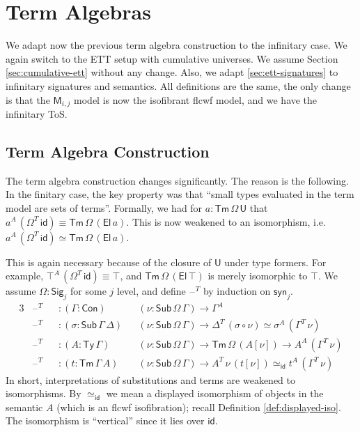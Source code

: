 \documentclass[12pt,a4paper,twoside,openany]{book}
\theoremstyle{remark}
\theoremstyle{definition}
\theoremstyle{theorem}
\newcommand{\bs}[1]{\boldsymbol{#1}}
\newcommand{\id}{\mathsf{id}}
\newcommand{\Con}{\mathsf{Con}}
\newcommand{\Sub}{\mathsf{Sub}}
\newcommand{\Tm}{\mathsf{Tm}}
\newcommand{\Ty}{\mathsf{Ty}}
\newcommand{\U}{\mathsf{U}}
\newcommand{\El}{\mathsf{El}}
\newcommand{\blank}{\mathord{\hspace{1pt}\text{--}\hspace{1pt}}}
\newcommand{\Sig}{\mathsf{Sig}}
\newcommand{\syn}{\mathsf{syn}}
\newcommand{\bM}{\bs{\mathsf{M}}}
\begin{document}
\section{Term Algebras}
\label{sec:inf-term-algebras}

We adapt now the previous term algebra construction to the infinitary
case. We again switch to the ETT setup with cumulative universes. We
assume Section \ref{sec:cumulative-ett} without any change. Also, we adapt
\ref{sec:ett-signatures} to infinitary signatures and semantics. All definitions
are the same, the only change is that the $\bM_{i,j}$ model is now the
isofibrant flcwf model, and we have the infinitary ToS.

\subsection{Term Algebra Construction}
\label{sec:iqii-term-algebra-construction}

The term algebra construction changes significantly. The reason is the
following. In the finitary case, the key property was that ``small types
evaluated in the term model are sets of terms''. Formally, we had for $a :
\Tm\,\Omega\,\U$ that $a^A\,(\Omega^T\,\id) \equiv \Tm\,\Omega\,(\El\,a)$.  This
is now weakened to an isomorphism, i.e.\ $a^A\,(\Omega^T\,\id) \simeq
\Tm\,\Omega\,(\El\,a)$.

This is again necessary because of the closure of $\U$ under type formers. For
example, $\top^A\,(\Omega^T\,\id) \equiv \top$, and $\Tm\,\Omega\,(\El\,\top)$
is merely isomorphic to $\top$. We assume $\Omega : \Sig_j$ for some $j$
level, and define $\blank^T$ by induction on $\syn_j$.
\begin{alignat*}{3}
  &\blank^T &&: (\Gamma : \Con)&&(\nu : \Sub\,\Omega\,\Gamma) \to \Gamma^A\\
  &\blank^T &&: (\sigma : \Sub\,\Gamma\,\Delta)&&(\nu : \Sub\,\Omega\,\Gamma) \to \Delta^T\,(\sigma \circ \nu) \simeq \sigma^A\,(\Gamma^T\,\nu)\\
  &\blank^T &&: (A : \Ty\,\Gamma)&&(\nu : \Sub\,\Omega\,\Gamma) \to \Tm\,\Omega\,(A[\nu])
  \to A^A\,(\Gamma^T\,\nu)\\
  &\blank^T &&: (t : \Tm\,\Gamma\,A)&&(\nu : \Sub\,\Omega\,\Gamma) \to A^T\,\nu\,(t[\nu]) \simeq_{\id} t^A\,(\Gamma^T\,\nu)
\end{alignat*}
In short, interpretations of substitutions and terms are weakened to
isomorphisms.  By $\simeq_{\id}$ we mean a displayed isomorphism of objects in
the semantic $A$ (which is an flcwf isofibration); recall Definition
\ref{def:displayed-iso}.  The isomorphism is ``vertical'' since it lies over
$\id$.
\end{document}
